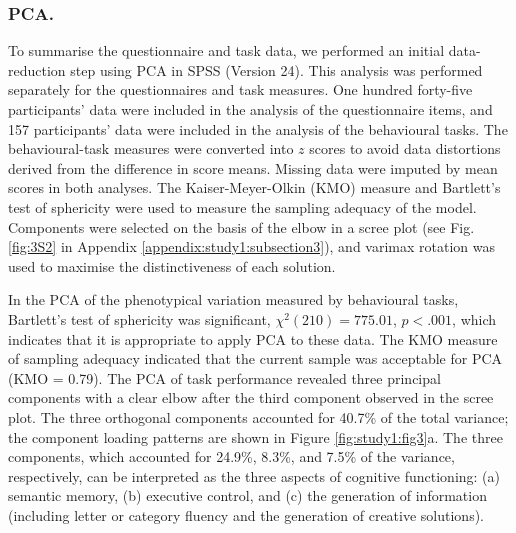 \subsubsection{PCA.}
To summarise the questionnaire and task data, we performed an initial data-reduction step using PCA in SPSS (Version 24). This analysis was performed separately for the questionnaires and task measures. One hundred forty-five participants’ data were included in the analysis of the questionnaire items, and 157 participants’ data were included in the analysis of the behavioural tasks. The behavioural-task measures were converted into \(\mathit{z}\) scores to avoid data distortions derived from the difference in score means. Missing data were imputed by mean scores in both analyses. The Kaiser-Meyer-Olkin (KMO) measure and Bartlett’s test of sphericity were used to measure the sampling adequacy of the model. Components were selected on the basis of the elbow in a scree plot (see Fig.\ref{fig:3S2} in Appendix \ref{appendix:study1:subsection3}), and varimax rotation was used to maximise the distinctiveness of each solution.

In the PCA of the phenotypical variation measured by behavioural tasks, Bartlett’s test of sphericity was significant,
\(\chi^{2}(210) = 775.01\),
\(\mathit{p} < .001\),
which indicates that it is appropriate to apply PCA to these data. The KMO measure of sampling adequacy indicated that the current sample was acceptable for PCA (KMO = 0.79). The PCA of task performance revealed three principal components with a clear elbow after the third component observed in the scree plot. The three orthogonal components accounted for 40.7\% of the total variance; the component loading patterns are shown in Figure \ref{fig:study1:fig3}a. The three components, which accounted for 24.9\%, 8.3\%, and 7.5\% of the variance, respectively, can be interpreted as the three aspects of cognitive functioning: (a) semantic memory, (b) executive control, and (c) the generation of information (including letter or category fluency and the generation of creative solutions).

